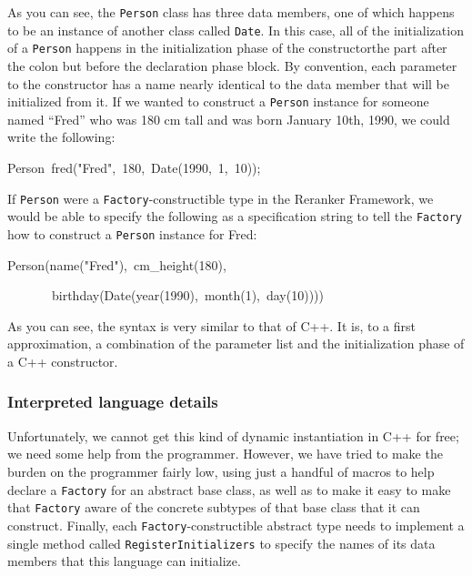 \documentclass[a4paper]{article}
\let\textquotedbl="
\newenvironment{lyxcode}
{\par\begin{list}{}{
\scriptsize
\setlength{\leftmargin}{0.1in}
\setlength{\rightmargin}{\leftmargin}
\setlength{\listparindent}{0pt}%
\raggedright
\setlength{\itemsep}{0pt}
\setlength{\parsep}{0pt}
\normalfont\ttfamily}%
 \item[]}
{\end{list}}
\begin{document}
As you can see, the \texttt{Person} class has three data members,
one of which happens to be an instance of another class called \texttt{Date}.
In this case, all of the initialization of a \texttt{Person} happens
in the initialization phase of the constructor\textemdash{}the part
after the colon but before the declaration phase block. By convention,
each parameter to the constructor has a name nearly identical to the
data member that will be initialized from it. If we wanted to construct
a \texttt{Person} instance for someone named \textquotedblleft{}Fred\textquotedblright{}
who was 180 cm tall and was born January 10th, 1990, we could write
the following:
\begin{lyxcode}
Person~fred(\textquotedbl{}Fred\textquotedbl{},~180,~Date(1990,~1,~10));
\end{lyxcode}
If \texttt{Person} were a \texttt{Factory}-constructible type in the
Reranker Framework, we would be able to specify the following as a
specification string to tell the \texttt{Factory} how to construct
a \texttt{Person} instance for Fred:
\begin{lyxcode}
Person(name(\textquotedbl{}Fred\textquotedbl{}),~cm\_height(180),

~~~~~~~birthday(Date(year(1990),~month(1),~day(10))))
\end{lyxcode}
As you can see, the syntax is very similar to that of C++. It is,
to a first approximation, a combination of the parameter list and
the initialization phase of a C++ constructor.


\subsubsection{Interpreted language details}

Unfortunately, we cannot get this kind of dynamic instantiation in
C++ for free; we need some help from the programmer. However, we have
tried to make the burden on the programmer fairly low, using just
a handful of macros to help declare a \texttt{Factory} for an abstract
base class, as well as to make it easy to make that \texttt{Factory}
aware of the concrete subtypes of that base class that it can construct.
Finally, each \texttt{Factory}-constructible abstract type needs to
implement a single method called \texttt{RegisterInitializers} to
specify the names of its data members that this language can initialize.

\end{document}
